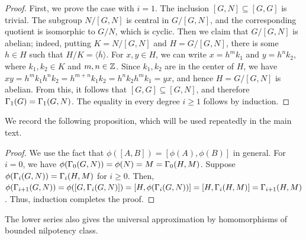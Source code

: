 \begin{proof}
First, we prove the case with $i=1$. The inclusion $[G,N] \subseteq [G,G]$ is trivial. The subgroup $N/[G,N]$ is central in $G/[G,N]$, and the corresponding quotient is isomorphic to $G/N$, which is cyclic. Then we claim that $G/[G,N]$ is abelian; indeed, putting $K=N/[G,N]$ and $H=G/[G,N]$, there is some $h \in H$ such that $H/K=\langle \overline{h}\rangle$. For $x,y \in H$, we can write $x=h^m k_1$ and $y=h^nk_2$, where $k_1,k_2\in K$ and $m,n\in \mathbb{Z}$. Since $k_1,k_2$ are in the center of $H$, we have $xy=h^mk_1h^n k_2 = h^{m+n}k_1k_2 = h^nk_2 h^mk_1 = yx$, and hence $H=G/[G,N]$ is abelian.
From this, it follows that $[G,G]\subseteq[G,N]$, and therefore $\Gamma_1(G)=\Gamma_1(G,N)$. The equality in every degree
$i\geq1$ follows by induction.
\end{proof}

We record the following proposition, which will be used repeatedly in the main text.


\begin{proof}
    We use the fact that $\phi([A,B])=[\phi(A),\phi(B)]$ in general. For $i=0$, we have $\phi(\Gamma_0(G,N))=\phi(N)=M=\Gamma_0(H,M)$. Suppose $\phi(\Gamma_i(G, N)) = \Gamma_i(H, M)$ for $i\geq 0$. Then, $\phi(\Gamma_{i+1}(G, N)) = \phi([G,\Gamma_i(G,N)]) =[H,\phi(\Gamma_i(G,N))]= [H,\Gamma_i(H,M)]=\Gamma_{i+1}(H, M)$. Thus, induction completes the proof.
\end{proof}

The lower series also gives the universal approximation by homomorphisms of bounded nilpotency class.


